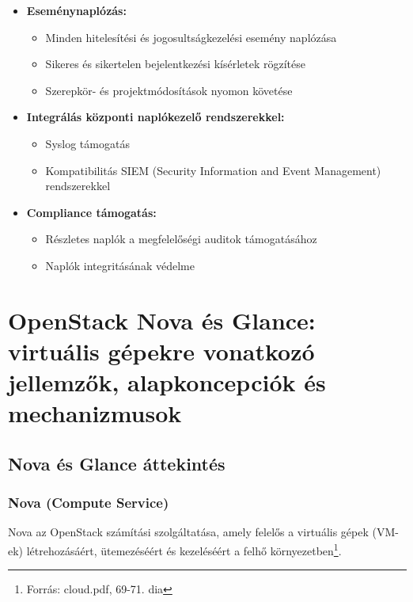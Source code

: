 \documentclass[a4paper,12pt]{article}
\begin{document}
    \begin{itemize}
        \item \textbf{Eseménynaplózás:}
        \begin{itemize}
            \item Minden hitelesítési és jogosultságkezelési esemény naplózása
            \item Sikeres és sikertelen bejelentkezési kísérletek rögzítése
            \item Szerepkör- és projektmódosítások nyomon követése
        \end{itemize}

        \item \textbf{Integrálás központi naplókezelő rendszerekkel:}
        \begin{itemize}
            \item Syslog támogatás
            \item Kompatibilitás SIEM (Security Information and Event Management) rendszerekkel
        \end{itemize}

        \item \textbf{Compliance támogatás:}
        \begin{itemize}
            \item Részletes naplók a megfelelőségi auditok támogatásához
            \item Naplók integritásának védelme
        \end{itemize}
    \end{itemize}

    \newpage


    \section{OpenStack Nova és Glance: virtuális gépekre vonatkozó jellemzők, alapkoncepciók és mechanizmusok}

    \subsection{Nova és Glance áttekintés}

    \subsubsection{Nova (Compute Service)}

    Nova az OpenStack számítási szolgáltatása, amely felelős a virtuális gépek (VM-ek) létrehozásáért, ütemezéséért és kezeléséért a felhő környezetben\footnote{Forrás: cloud.pdf, 69-71. dia}.
\end{document}

